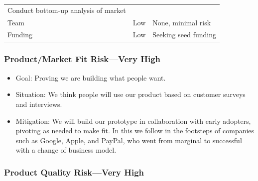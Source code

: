 \documentclass[11pt,openany]{book}
\providecommand{\tightlist}{%
  \setlength{\itemsep}{0pt}\setlength{\parskip}{0pt}}
\begin{document}
\begin{longtable}[]{@{}lcl@{}}
\begin{minipage}[t]{0.49\columnwidth}
Conduct bottom-up analysis of market\strut
\end{minipage}\tabularnewline
\begin{minipage}[t]{0.26\columnwidth}\raggedright
Team\strut
\end{minipage} & \begin{minipage}[t]{0.16\columnwidth}\centering
Low\strut
\end{minipage} & \begin{minipage}[t]{0.49\columnwidth}\raggedright
None, minimal risk\strut
\end{minipage}\tabularnewline
\begin{minipage}[t]{0.26\columnwidth}\raggedright
Funding\strut
\end{minipage} & \begin{minipage}[t]{0.16\columnwidth}\centering
Low\strut
\end{minipage} & \begin{minipage}[t]{0.49\columnwidth}\raggedright
Seeking seed funding\strut
\end{minipage}\tabularnewline
\bottomrule
\end{longtable}

\hypertarget{productmarket-fit-riskvery-high}{%
\subsubsection{Product/Market Fit Risk---Very
High}\label{productmarket-fit-riskvery-high}}

\begin{itemize}
\tightlist
\item
  Goal: Proving we are building what people want.
\item
  Situation: We think people will use our product based on customer
  surveys and interviews.
\item
  Mitigation: We will build our prototype in collaboration with early
  adopters, pivoting as needed to make fit. In this we follow in the
  footsteps of companies such as Google, Apple, and PayPal, who went
  from marginal to successful with a change of business model.
\end{itemize}

\newpage{}

\hypertarget{product-quality-riskvery-high}{%
\subsubsection{Product Quality Risk---Very
High}\label{product-quality-riskvery-high}}
\end{document}
